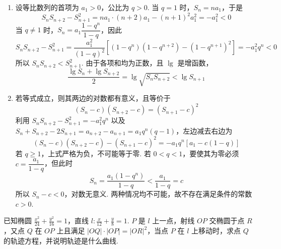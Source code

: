 \begin{solution}
\begin{enumerate}
\item 设等比数列的首项为 \(a_1>0\)，公比为 \(q>0\). 当 \(q=1\) 时，\(S_n=na_1\)，于是
\[
S_nS_{n+2}-S_{n+1}^2
=na_1\cdot(n+2)a_1-(n+1)^2a_1^2
=-a_1^2<0
\]
当 \(q\ne1\) 时，\(S_n=a_1\dfrac{1-q^n}{1-q}\)，因此
\[
S_nS_{n+2}-S_{n+1}^2
=\frac{a_1^2}{(1-q)^2}\left[(1-q^n)(1-q^{n+2})-(1-q^{n+1})^2\right]
=-a_1^2q^n<0
\]
所以 \(S_nS_{n+2}<S_{n+1}^2\). 由于各项和均为正数，且 \(\lg\) 是增函数，
\[
\frac{\lg S_n+\lg S_{n+2}}2
=\lg\sqrt{S_nS_{n+2}}
<\lg S_{n+1}
\]

\item 若等式成立，则其两边的对数都有意义，且等价于
\[
(S_n-c)(S_{n+2}-c)=(S_{n+1}-c)^2
\]
利用 \(S_nS_{n+2}-S_{n+1}^2=-a_1^2q^n\) 以及 \(S_n+S_{n+2}-2S_{n+1}=a_{n+2}-a_{n+1}=a_1q^n(q-1)\)，左边减去右边为
\[
(S_n-c)(S_{n+2}-c)-(S_{n+1}-c)^2
=-a_1q^n\left[a_1-c(1-q)\right]
\]
若 \(q\geqslant1\)，上式严格为负，不可能等于零. 若 \(0<q<1\)，要使其为零必须 \(c=\dfrac{a_1}{1-q}\)，但此时
\[
S_n=\frac{a_1(1-q^n)}{1-q}<\frac{a_1}{1-q}=c
\]
所以 \(S_n-c<0\)，对数无意义. 两种情况均不可能，故不存在满足条件的常数 \(c>0\).
\end{enumerate}
\end{solution}

\begin{problem}
已知椭圆 \(\frac{x^2}{24} + \frac{y^2}{16} = 1\)，直线 \(l: \frac{x}{12} + \frac{y}{8} = 1\). \(P\) 是 \(l\) 上一点，射线 \(OP\) 交椭圆于点 \(R\)，又点 \(Q\) 在 \(OP\) 上且满足 \(|OQ| \cdot |OP| = |OR|^2\)，当点 \(P\) 在 \(l\) 上移动时，求点 \(Q\) 的轨迹方程，并说明轨迹是什么曲线.
\end{problem}

